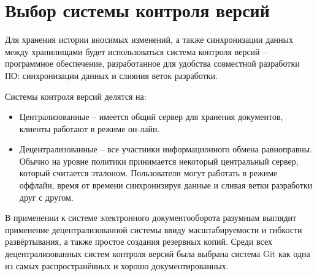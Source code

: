 \section{Выбор системы контроля версий} \label{technologic_cvs}

Для хранения истории вносимых изменений, а также синхронизации данных между хранилищами будет использоваться система контроля версий -- программное обеспечение, разработанное для удобства совместной разработки ПО: синхронизации данных и слияния веток разработки. 

\vspace{\baselineskip}
Системы контроля версий делятся на:
\begin{itemize}
		\item Централизованные -- имеется общий сервер для хранения документов, клиенты работают в режиме он-лайн.
		\item Децентрализованные -- все участники информационного обмена равноправны. Обычно на уровне политики принимается некоторый центральный сервер, который считается эталоном. Пользователи могут работать в режиме оффлайн, время от времени синхронизируя данные и сливая ветки разработки друг с другом.
	\end{itemize}

\vspace{\baselineskip}
В применении к системе электронного документооборота разумным выглядит применение децентрализованной системы ввиду масштабируемости и гибкости развёртывания, а также простое создания резервных копий. Среди всех децентрализованных систем контроля версий была выбрана система Git как одна из самых распространённых и хорошо документированных.